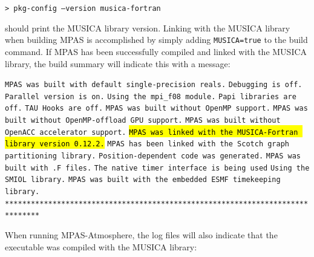 {\vspace{12pt}
{\tt > pkg-config --version musica-fortran}
\vspace{12pt}

\noindent should print the MUSICA library version. Linking with the MUSICA library when building MPAS is accomplished by simply adding {\tt MUSICA=true} to the build command.
If MPAS has been successfully compiled and linked with the MUSICA library, the build summary will indicate this with a message:

\vspace{12pt}
\noindent {\tt *******************************************************************************} \newline
{\tt MPAS was built with default single-precision reals.} \newline
{\tt Debugging is off.} \newline
{\tt Parallel version is on.} \newline
{\tt Using the mpi\_f08 module.} \newline
{\tt Papi libraries are off.} \newline
{\tt TAU Hooks are off.} \newline
{\tt MPAS was built without OpenMP support.} \newline
{\tt MPAS was built without OpenMP-offload GPU support.} \newline
{\tt MPAS was built without OpenACC accelerator support.} \newline
{\tt \hl{MPAS was linked with the MUSICA-Fortran library version 0.12.2.}} \newline
{\tt MPAS has been linked with the Scotch graph partitioning library.} \newline
{\tt Position-dependent code was generated.} \newline
{\tt MPAS was built with .F files.} \newline
{\tt The native timer interface is being used} \newline
{\tt Using the SMIOL library.} \newline
{\tt MPAS was built with the embedded ESMF timekeeping library.} \newline
{\tt *******************************************************************************}
\vspace{12pt}

When running MPAS-Atmosphere, the log files will also indicate that the executable was compiled with the MUSICA library:

}
